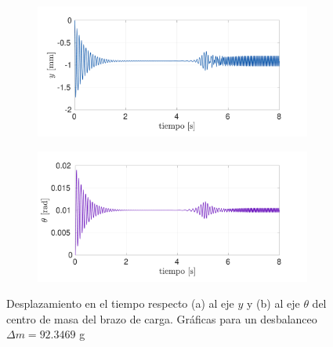\begin{figure}[p]
\centering
	\begin{subfigure}{1\linewidth}
		\centering
		\includegraphics[width=1\linewidth]{Imagenes/y_2.pdf}
		\caption{}\label{fig:y_2}
	\end{subfigure}
	\begin{subfigure}{1\linewidth}
		\centering
		\includegraphics[width=1\linewidth]{Imagenes/t_2.pdf}
		\caption{}\label{fig:t_2}
	\end{subfigure}
\par\bigskip
\caption{Desplazamiento en el tiempo respecto (a) al eje $y$ y (b) al eje $\theta$ del centro de masa del brazo de carga. Gráficas para un desbalanceo $\Delta m = 92.3469$ g }
\label{fig:yt_2}
\end{figure}


